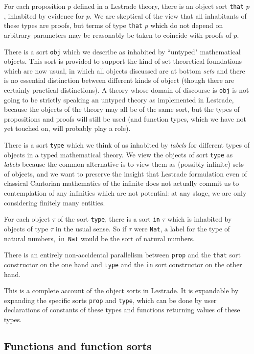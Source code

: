 \documentclass[12pt]{article}
\begin{document}
For each proposition $p$ defined in a Lestrade theory, there is an object sort {\tt that} $p$, inhabited by evidence for $p$.   We are skeptical of the view that all inhabitants of these types are proofs, but terms of type {\tt that} $p$ which do not depend on arbitrary parameters may be reasonably be taken to coincide with proofs of $p$.

There is a sort {\tt obj} which we describe as inhabited by ``untyped" mathematical objects.  This sort is provided to support the kind of set theoretical foundations which are now usual, in which all objects discussed are at bottom {\em sets\/} and there is no essential distinction between different kinds of object (though there are certainly practical distinctions).  A theory whose domain of discourse is {\tt obj} is not going to be strictly speaking an untyped theory as implemented in Lestrade, because the objects of the theory may all be of the same sort, but the types of propositions and proofs will still be used (and function types, which we have not yet touched on, will probably play a role).

There is a sort {\tt type} which we think of as inhabited by {\em labels\/} for different types of objects in a typed mathematical theory.  We view the objects of sort {\tt type} as {\em labels\/} because the common alternative is to view them as (possibly infinite) sets of objects, and we want to preserve the insight that Lestrade formulation even of classical Cantorian mathematics of the infinite does not actually commit us to contemplation of any infinities which are not potential:  at any stage, we are only considering finitely many entities.

For each object $\tau$ of the sort {\tt type}, there is a sort {\tt in} $\tau$ which is inhabited by objects of type $\tau$ in the usual sense.  So if $\tau$ were {\tt Nat}, a label for the type of natural numbers, {\tt in Nat} would be the sort of natural numbers.

There is an entirely non-accidental parallelism between {\tt prop} and the {\tt that} sort constructor on the one hand
and {\tt type} and the {\tt in} sort constructor on the other hand.

This is a complete account of the object sorts in Lestrade.  It is expandable by expanding the specific sorts
{\tt prop} and {\tt type}, which can be done by user declarations of constants of these types and functions returning values of these types.

\subsection{Functions and function sorts}
\end{document}
